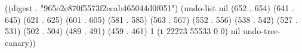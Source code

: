 
((digest . "965e2e870f5573f2ecab465044d0f051") (undo-list nil (652 . 654) (641 . 645) (621 . 625) (601 . 605) (581 . 585) (563 . 567) (552 . 556) (538 . 542) (527 . 531) (502 . 504) (489 . 491) (459 . 461) 1 (t 22273 55533 0 0) nil undo-tree-canary))
